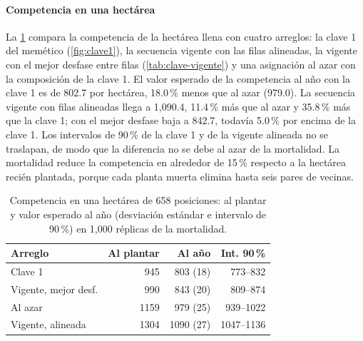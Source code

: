 \paragraph{Competencia en una hectárea} La \cref{tab:siembra-competencia} compara la competencia de la hectárea llena con cuatro arreglos: la clave 1 del memético (\cref{fig:clave1}), la secuencia vigente con las filas alineadas, la vigente con el mejor desfase entre filas (\cref{tab:clave-vigente}) y una asignación al azar con la composición de la clave 1. El valor esperado de la competencia al año con la clave 1 es de 802.7 por hectárea, 18.0\,\% menos que al azar (979.0). La secuencia vigente con filas alineadas llega a 1{,}090.4, 11.4\,\% más que al azar y 35.8\,\% más que la clave 1; con el mejor desfase baja a 842.7, todavía 5.0\,\% por encima de la clave 1. Los intervalos de 90\,\% de la clave 1 y de la vigente alineada no se traslapan, de modo que la diferencia no se debe al azar de la mortalidad. La mortalidad reduce la competencia en alrededor de 15\,\% respecto a la hectárea recién plantada, porque cada planta muerta elimina hasta seis pares de vecinas.

\begin{table}[t]
\centering
\caption{Competencia en una hectárea de 658 posiciones: al plantar y valor esperado al año (desviación estándar e intervalo de 90\,\%) en 1{,}000 réplicas de la mortalidad.}
\label{tab:siembra-competencia}
\footnotesize
\setlength{\tabcolsep}{3pt}
\begin{tabular}{@{}lrrr@{}}
\toprule
Arreglo & Al plantar & Al año & Int. 90\,\% \\
\midrule
Clave 1              &  945 &  803 (18) &   773--832 \\
Vigente, mejor desf. &  990 &  843 (20) &   809--874 \\
Al azar              & 1159 &  979 (25) &   939--1022 \\
Vigente, alineada    & 1304 & 1090 (27) &  1047--1136 \\
\bottomrule
\end{tabular}
\end{table}

